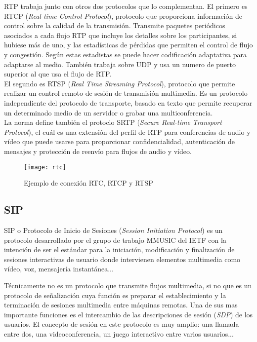 RTP trabaja junto con otros dos protocolos que lo complementan. El primero es RTCP (\emph{Real time Control Protocol}), protocolo que proporciona información de control sobre la calidad de la transmisión. Transmite paquetes periódicos asociados a cada flujo RTP que incluye los detalles sobre los participantes, si hubiese más de uno, y las estadísticas de pérdidas que permiten el control de flujo y congestión. Según estas estadistas se puede hacer codificación adaptativa para adaptarse al medio. También trabaja sobre UDP y usa un numero de puerto superior al que usa el flujo de RTP.\\

El segundo es RTSP (\emph{Real Time Streaming Protocol}), protocolo que permite realizar un control remoto de sesión de transmisión multimedia. Es un protocolo independiente del protocolo de transporte, basado en texto que permite recuperar un determinado medio de un servidor o grabar una multiconferencia.\\

La norma define también el protoclo SRTP (\emph{Secure Real-time Transport Protocol}), el cuál es una extensión del perfil de RTP para conferencias de audio y vídeo que puede usarse para proporcionar confidencialidad, autenticación de mensajes y protección de reenvío para flujos de audio y vídeo.\\


\begin{figure}[htb]
\centering
\texttt{[image: rtc]}
\caption{Ejemplo de conexión RTC, RTCP y RTSP}
\label{fig:rtc}
\end{figure}


\subsection{SIP}

SIP o Protocolo de Inicio de Sesiones (\emph{Session Initiation Protocol}) es un protocolo desarrollado por el grupo de trabajo MMUSIC del IETF con la intención de ser el estándar para la iniciación, modificación y finalización de sesiones interactivas de usuario donde intervienen elementos multimedia como vídeo, voz, mensajería instantánea...

Técnicamente no es un protocolo que transmite flujos multimedia, si no que es un protocolo de señalización cuya función es preparar el establecimiento y la terminación de sesiones multimedia entre máquinas remotas. Una de sus mas importante funciones es el intercambio de las descripciones de sesión (\emph{SDP}) de los usuarios. El concepto de sesión en este protocolo es muy amplio: una llamada entre dos, una videoconferencia, un juego interactivo entre varios usuarios...\\

